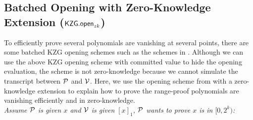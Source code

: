 \subsection{Batched Opening with Zero-Knowledge Extension ($\mathsf{KZG.open}_{zk}$)}
\label{sec:kgzzkp}

To efficiently prove several polynomials are vanishing at several points, there are some batched KZG opening schemes such as the schemes in \cite{plonk,bdfg,fflonk}. Although we can use the above KZG opening scheme with committed value to hide the opening evaluation, the scheme is not zero-knowledge because we cannot simulate the transcript between $\mathcal{P}$ and $\mathcal{V}$. Here, we use the opening scheme from \cite{plonk} with a zero-knowledge extension to explain how to prove the range-proof polynomials are vanishing efficiently and in zero-knowledge. \\
\textit{Assume $\mathcal{P}$ is given $x$ and $\mathcal{V}$ is given $[x]_1$, $\mathcal{P}$ wants to prove $x$ is in $[0,2^k)$:}
